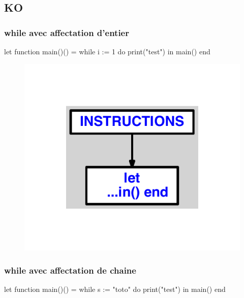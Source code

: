\documentclass{article}
\begin{document}
\subsection{KO}
\subsubsection{while avec affectation d'entier}
\begin{verbatimtab}
let
	function main()() =
		while i := 1 do
			print("test")
in main() end
\end{verbatimtab}
\begin{figure}[H]\centering\includegraphics[max width=\textwidth]{ast/ast_314.pdf}\end{figure}\subsubsection{while avec affectation de chaine}
\begin{verbatimtab}
let
	function main()() =
		while s := "toto" do
			print("test")
in main() end
\end{verbatimtab}
\end{document}
